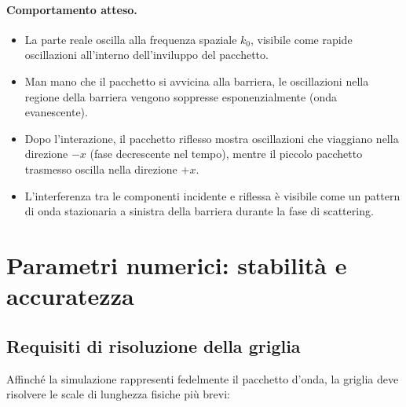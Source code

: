 \documentclass[12pt, a4paper]{article}
\begin{document}
\paragraph{Comportamento atteso.}
\begin{itemize}
  \item La parte reale oscilla alla frequenza spaziale $k_0$, visibile
        come rapide oscillazioni all'interno dell'inviluppo del pacchetto.
  \item Man mano che il pacchetto si avvicina alla barriera, le
        oscillazioni nella regione della barriera vengono soppresse
        esponenzialmente (onda evanescente).
  \item Dopo l'interazione, il pacchetto riflesso mostra oscillazioni
        che viaggiano nella direzione $-x$ (fase decrescente nel
        tempo), mentre il piccolo pacchetto trasmesso oscilla nella
        direzione $+x$.
  \item L'interferenza tra le componenti incidente e riflessa è
        visibile come un pattern di onda stazionaria a sinistra della
        barriera durante la fase di scattering.
\end{itemize}

\section{Parametri numerici: stabilità e accuratezza}

\subsection{Requisiti di risoluzione della griglia}

Affinché la simulazione rappresenti fedelmente il pacchetto d'onda,
la griglia deve risolvere le scale di lunghezza fisiche più brevi:
\end{document}

